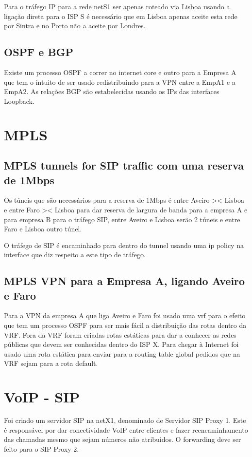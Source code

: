 \documentclass[pdftex,12pt,a4paper]{report}
\begin{document}
Para o tráfego IP para a rede netS1 ser apenas roteado via Lisboa usando a ligação direta para o ISP S é necessário que em Lisboa apenas aceite esta rede por Sintra e no Porto não a aceite por Londres.

\subsection{OSPF e BGP}

Existe um processo OSPF a correr no internet core e outro para a Empresa A que tem o intuito de ser usado redistribuindo para a VPN entre a EmpA1 e a EmpA2. As relações BGP são estabelecidas usando os IPs das interfaces Loopback.

\section{MPLS}

\subsection{MPLS tunnels for SIP traffic com uma reserva de 1Mbps}
Os túneis que são necessários para a reserva de 1Mbps é entre Aveiro >< Lisboa e entre Faro >< Lisboa para dar reserva de largura de banda para a empresa A e para empresa B para o tráfego SIP, entre Aveiro e Lisboa serão 2 túneis e entre Faro e Lisboa outro túnel.

O tráfego de SIP é encaminhado para dentro do tunnel usando uma ip policy na interface que diz respeito a este tipo de tráfego.

\subsection{MPLS VPN para a Empresa A, ligando Aveiro e Faro}
Para a VPN da empresa A que liga Aveiro e Faro foi usado uma vrf para o efeito que tem um processo OSPF para ser mais fácil a distribuição das rotas dentro da VRF. Fora da VRF foram criadas rotas estáticas para dar a conhecer as redes públicas que devem ser conhecidas dentro do ISP X. Para chegar à Internet foi usado uma rota estática para enviar para a routing table global pedidos que na VRF sejam para a rota default.

\section{VoIP - SIP}

Foi criado um servidor SIP na netX1, denominado de Servidor SIP Proxy 1. Este é responsável por dar conectividade VoIP entre clientes e fazer reencaminhamento das chamadas mesmo que sejam números não atribuidos. O forwarding deve ser feito para o SIP Proxy 2.
\end{document}

